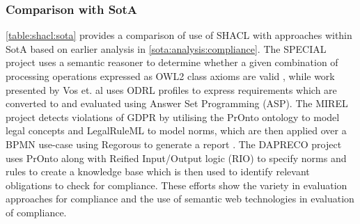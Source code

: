 \subsubsection*{Comparison with SotA}
\autoref{table:shacl:sota} provides a comparison of use of SHACL with approaches within SotA based on earlier analysis in \autoref{sota:analysis:compliance}.
The SPECIAL project uses a semantic reasoner to determine whether a given combination of processing operations expressed as OWL2 class axioms are valid \cite{westphal_spirit_2018}, while work presented by Vos et. al \cite{vos_odrl_2019} uses ODRL profiles to express requirements which are converted to and evaluated using Answer Set Programming (ASP).
The MIREL project detects violations of GDPR by utilising the PrOnto ontology \cite{palmirani_pronto_2018,palmirani_pronto_2018-1,monica_modelling_2018} to model legal concepts and LegalRuleML to model norms, which are then applied over a BPMN use-case using Regorous to generate a report \cite{monica_modelling_2018}.
The DAPRECO project uses PrOnto along with Reified Input/Output logic (RIO) \cite{robaldo_reified_2017} to specify norms and rules to create a knowledge base \cite{bartolini_agile_2019} which is then used to identify relevant obligations to check for compliance.
These efforts show the variety in evaluation approaches for compliance and the use of semantic web technologies in evaluation of compliance.

